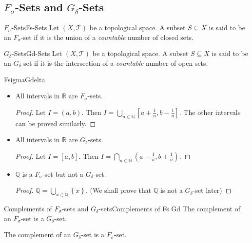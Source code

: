 \documentclass[../main.tex]{subfiles}
\begin{document}
\subsection{$F_{\sigma}$-Sets and $G_{\delta}$-Sets}
\begin{definition}{$F_{\sigma}$-Sets}{Fs-Sets}
Let $(X,\mathcal{T})$ be a topological space. A subset $S \subseteq X$ is said to be an $F_{\sigma}$-set if it is the union of a \emph{countable} number of closed sets.
\end{definition}
\begin{definition}{$G_{\delta}$-Sets}{Gd-Sets}
Let $(X,\mathcal{T})$ be a topological space. A subset $S \subseteq X$ is said to be an $G_{\delta}$-set if it is the intersection of a \emph{countable} number of open sets.
\end{definition}
\begin{example}{}{FsigmaGdelta}
\begin{itemize}
	\item All intervals in $\mathbb{R}$ are $F_{\sigma}$-sets.
		\begin{proof}
		Let $I = (a,b)$. Then $I = \bigcup_{n\in \mathbb{N}} \left[ a + \frac{1}{n}, b - \frac{1}{n} \right] $.
		The other intervals can be proved similarly.
		\end{proof}
	\item All intervals in $\mathbb{R}$ are $G_{\delta}$-sets.
		\begin{proof}
		Let $I = [a,b]$. Then $I = \bigcap_{n\in \mathbb{N}} \left( a - \frac{1}{n}, b + \frac{1}{n} \right) $.
		\end{proof}
	\item $\mathbb{Q}$ is a $F_{\sigma}$-set but not a $G_{\delta}$-set.
		\begin{proof}
			$\mathbb{Q} = \bigcup_{x\in \mathbb{Q}} \left\{ x \right\} $. (We shall prove that $\mathbb{Q}$ is not a $G_{\delta}$-set later)
		\end{proof}
\end{itemize}
\end{example}

\begin{theorem}{Complements of $F_{\sigma}$-sets and $G_{\delta}$-sets}{Complements of Fs Gd}
	The complement of an $F_{\sigma}$-set is a $G_{\delta}$-set.

	The complement of an $G_{\delta}$-set is a $F_{\sigma}$-set.
\end{theorem}
\end{document}
